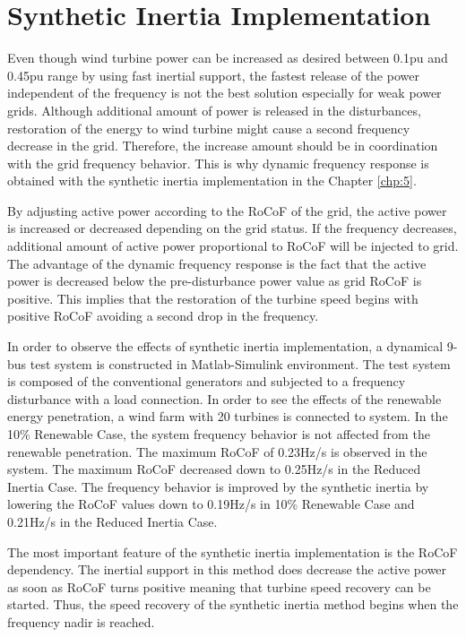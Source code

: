 \section{Synthetic Inertia Implementation}
Even though wind turbine power can be increased as desired between 0.1pu and 0.45pu range by using fast inertial support, the fastest release of the power independent of the frequency is not the best solution especially for weak power grids. Although additional amount of power is released in the disturbances, restoration of the energy to wind turbine might cause a second frequency decrease in the grid. Therefore, the increase amount should be in coordination with the grid frequency behavior. This is why dynamic frequency response is obtained with the synthetic inertia implementation in the Chapter \ref{chp:5}. \par
By adjusting active power according to the RoCoF of the grid, the active power is increased or decreased depending on the grid status. If the frequency decreases, additional amount of active power proportional to RoCoF will be injected to grid. The advantage of the dynamic frequency response is the fact that the active power is decreased below the pre-disturbance power value as grid RoCoF is positive. This implies that the restoration of the turbine speed begins with positive RoCoF avoiding a second drop in the frequency.\par
In order to observe the effects of synthetic inertia implementation, a dynamical 9-bus test system is constructed in Matlab-Simulink environment. The test system is composed of the conventional generators and subjected to a frequency disturbance with a load connection. In order to see the effects of the renewable energy penetration, a wind farm with 20 turbines is connected to system. In the 10\% Renewable Case, the system frequency behavior is not affected from the renewable penetration. The maximum RoCoF of 0.23Hz/s is observed in the system. The maximum RoCoF decreased down to 0.25Hz/s in the Reduced Inertia Case. The frequency behavior is improved by the synthetic inertia by lowering the RoCoF values down to 0.19Hz/s in 10\% Renewable Case and 0.21Hz/s in the Reduced Inertia Case.
\par
The most important feature of the synthetic inertia implementation is the RoCoF dependency. The inertial support in this method does decrease the active power as soon as RoCoF turns positive meaning that turbine speed recovery can be started. Thus, the speed recovery of the synthetic inertia method begins when the frequency nadir is reached.\par
